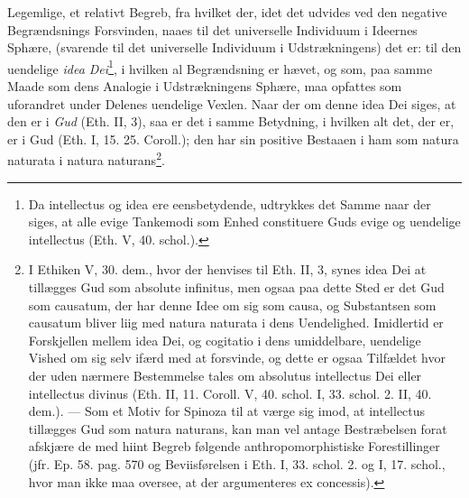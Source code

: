 \documentclass[12pt,a4paper]{book}
\newcommand{\opage}[1]{\marginnote{\footnotesize\textit{[#1]}}}
\begin{document}
Legemlige, et relativt Begreb, fra hvilket der, idet det
\opage{84} \setcounter{footnote}{0}%
udvides ved den negative Begrændsnings Forsvinden, naaes til
det universelle Individuum i Ideernes Sphære, (svarende til det
universelle Individuum i Udstrækningens) det er: til den
uendelige \emph{idea Dei}\footnote{Da intellectus og idea ere
eensbetydende, udtrykkes det Samme naar der siges, at alle
evige Tankemodi som Enhed constituere Guds evige og uendelige
intellectus (Eth. V, 40. schol.).}, i hvilken al Begrændsning
er hævet, og som, paa samme Maade som dens Analogie i
Udstrækningens Sphære, maa opfattes som uforandret under
Delenes uendelige Vexlen. Naar der om denne idea Dei siges, at
den er i \emph{Gud} (Eth. II, 3), saa er det i samme Betydning, i
hvilken alt det, der er, er i Gud (Eth. I, 15. 25. Coroll.);
den har sin positive Bestaaen i ham som natura naturata i
natura naturans\footnote{I Ethiken V, 30. dem., hvor der
henvises til Eth. II, 3, synes idea Dei at tillægges Gud som
absolute infinitus, men ogsaa paa dette Sted er det Gud som
causatum, der har denne Idee om sig som causa, og Substantsen
som causatum bliver liig med natura naturata i dens
Uendelighed. Imidlertid er Forskjellen mellem idea Dei, og
cogitatio i dens umiddelbare, uendelige Vished om sig selv
ifærd med at forsvinde, og dette er ogsaa Tilfældet hvor der
uden nærmere Bestemmelse tales om absolutus intellectus Dei
eller intellectus divinus (Eth. II, 11. Coroll. V, 40. schol.
I, 33. schol. 2. II, 40. dem.). --- Som et Motiv for Spinoza
til at værge sig imod, at intellectus tillægges Gud som natura
naturans, kan man vel antage Bestræbelsen forat afskjære de
med hiint Begreb følgende anthropomorphistiske Forestillinger
(jfr. Ep. 58. pag. 570 og Beviisførelsen i Eth. I, 33. schol.
2. og I, 17. schol., hvor man ikke maa oversee, at der
argumenteres ex concessis).}.
\end{document}
